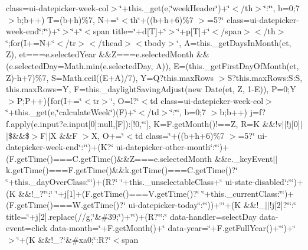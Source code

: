 {{\begin{DoxyParamCaption}
class=\textquotesingle{}ui-\/datepicker-\/week-\/col\textquotesingle{}$>$\char`\"{}+this.\+\_\+get(e,\char`\"{}week\+Header\char`\"{})+\char`\"{}$<$/th$>$\char`\"{}\+:\char`\"{}\char`\"{}, b=0;7 $>$b;b++) T=(b+h)\%7, N+=\char`\"{}$<$th\char`\"{}+((b+h+6)\%7 $>$=5?\char`\"{} class=\textquotesingle{}ui-\/datepicker-\/week-\/end\textquotesingle{}\char`\"{}\+:\char`\"{}\char`\"{})+\char`\"{}$>$\char`\"{}+\char`\"{}$<$span title=\textquotesingle{}\char`\"{}+d\mbox{[}\+T\mbox{]}+\char`\"{}\textquotesingle{}$>$\char`\"{}+p\mbox{[}\+T\mbox{]}+\char`\"{}$<$/span$>$$<$/th$>$\char`\"{};for(\+I+=\+N+\char`\"{}$<$/tr$>$$<$/thead$>$$<$tbody$>$\char`\"{}, A=this.\+\_\+get\+Days\+In\+Month(et, Z), et===e.\+selected\+Year \&\&\+Z===e.\+selected\+Month \&\&(e.\+selected\+Day=\+Math.\+min(e.\+selected\+Day, A)), E=(this.\+\_\+get\+First\+Day\+Of\+Month(et, Z)-\/h+7)\%7, S=\+Math.\+ceil((\+E+\+A)/7), Y=\+Q?this.\+max\+Rows $>$\+S?this.\+max\+Rows\+:\+S\+:\+S, this.\+max\+Rows=\+Y, F=this.\+\_\+daylight\+Saving\+Adjust(new Date(et, Z, 1-\/\+E)), P=0;\+Y $>$\+P;\+P++)\{for(\+I+=\char`\"{}$<$tr$>$\char`\"{}, O=l?\char`\"{}$<$td class=\textquotesingle{}ui-\/datepicker-\/week-\/col\textquotesingle{}$>$\char`\"{}+this.\+\_\+get(e,\char`\"{}calculate\+Week\char`\"{})(\+F)+\char`\"{}$<$/td$>$\char`\"{}\+:\char`\"{}\char`\"{}, b=0;7 $>$b;b++) j=f?f.\+apply(e.\+input?e.\+input\mbox{[}0\mbox{]}\+:null,\mbox{[}\+F\mbox{]})\+:\mbox{[}!0,\char`\"{}\char`\"{}\mbox{]}, K=\+F.\+get\+Month()!==\+Z, R=\+K \&\&!v$\vert$$\vert$!j\mbox{[}0\mbox{]}$\vert$$\vert$\$\&\&\$$>$\+F$\vert$$\vert$\+X \&\&\+F $>$\+X, O+=\char`\"{}$<$td class=\textquotesingle{}\char`\"{}+((b+h+6)\%7 $>$=5?\char`\"{} ui-\/datepicker-\/week-\/end\char`\"{}\+:\char`\"{}\char`\"{})+(\+K?\char`\"{} ui-\/datepicker-\/other-\/month\char`\"{}\+:\char`\"{}\char`\"{})+(\+F.\+get\+Time()===\+C.\+get\+Time()\&\&\+Z===e.\+selected\+Month \&\&e.\+\_\+key\+Event$\vert$$\vert$k.\+get\+Time()===\+F.\+get\+Time()\&\&k.\+get\+Time()===\+C.\+get\+Time()?\char`\"{} \char`\"{}+this.\+\_\+day\+Over\+Class\+:\char`\"{}\char`\"{})+(\+R?\char`\"{} \char`\"{}+this.\+\_\+unselectable\+Class+\char`\"{} ui-\/state-\/disabled\char`\"{}\+:\char`\"{}\char`\"{})+(\+K \&\&!\+\_\+?\char`\"{}\char`\"{}\+:\char`\"{} \char`\"{}+j\mbox{[}1\mbox{]}+(\+F.\+get\+Time()===\+V.\+get\+Time()?\char`\"{} \char`\"{}+this.\+\_\+current\+Class\+:\char`\"{}\char`\"{})+(\+F.\+get\+Time()===\+W.\+get\+Time()?\char`\"{} ui-\/datepicker-\/today\char`\"{}\+:\char`\"{}\char`\"{}))+\char`\"{}\textquotesingle{}\char`\"{}+(\+K \&\&!\+\_\+$\vert$$\vert$!j\mbox{[}2\mbox{]}?\char`\"{}\char`\"{}\+:\char`\"{} title=\textquotesingle{}\char`\"{}+j\mbox{[}2\mbox{]}.\+replace(/\textquotesingle{}/g,\char`\"{}\&\#39;\char`\"{})+\char`\"{}\textquotesingle{}\char`\"{})+(\+R?\char`\"{}\char`\"{}\+:\char`\"{} data-\/handler=\textquotesingle{}select\+Day\textquotesingle{} data-\/event=\textquotesingle{}click\textquotesingle{} data-\/month=\textquotesingle{}\char`\"{}+\+F.\+get\+Month()+\char`\"{}\textquotesingle{} data-\/year=\textquotesingle{}\char`\"{}+\+F.\+get\+Full\+Year()+\char`\"{}\textquotesingle{}\char`\"{})+\char`\"{}$>$\char`\"{}+(\+K \&\&!\+\_\+?\char`\"{}\&\#xa0;\char`\"{}\+:\+R?\char`\"{}$<$span 
\end{DoxyParamCaption}}}
